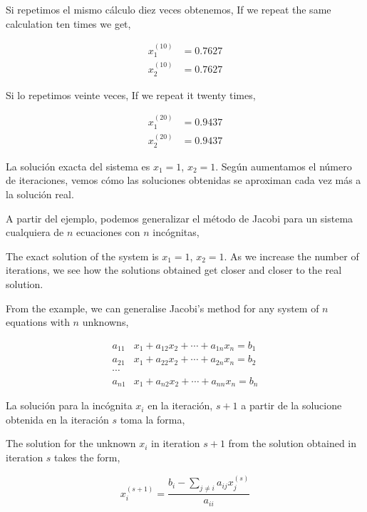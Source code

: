 \begin{paracol}{2}
Si repetimos el mismo cálculo diez veces obtenemos,
\switchcolumn
If we repeat the same calculation ten times we get,
\end{paracol}

\begin{align*}
x_1^{(10)}&=0.7627\\
x_2^{(10)}&=0.7627
\end{align*}

\begin{paracol}{2}
Si lo repetimos veinte veces,
\switchcolumn
If we repeat it twenty times,
\end{paracol}

\begin{align*}
x_1^{(20)}&=0.9437\\
x_2^{(20)}&=0.9437
\end{align*}

\begin{paracol}{2}
La solución exacta del sistema es $x_1=1$, $x_2=1$. Según aumentamos el número de iteraciones, vemos cómo las soluciones obtenidas se aproximan cada vez más a la solución real.

A partir del ejemplo, podemos generalizar el método de Jacobi para un sistema cualquiera de $n$ ecuaciones con $n$ incógnitas,

\switchcolumn
The exact solution of the system is $x_1=1$, $x_2=1$. As we increase the number of iterations, we see how the solutions obtained get closer and closer to the real solution.

From the example, we can generalise Jacobi's method for any system of $n$ equations with $n$ unknowns,
\end{paracol}

\begin{align*}
a_{11}&x_1+a_{12}x_2+\cdots +a_{1n}x_n=b_1\\
a_{21}&x_1+a_{22}x_2+\cdots +a_{2n}x_n=b_2\\
\cdots & \\
a_{n1}&x_1+a_{n2}x_2+\cdots +a_{nn}x_n=b_n
\end{align*}

\begin{paracol}{2}

La solución para la incógnita $x_i$ en la iteración, $s+1$ a partir de la solucione obtenida en la iteración $s$ toma la forma,

\switchcolumn
The solution for the unknown $x_i$ in iteration $s+1$ from the solution obtained in iteration $s$ takes the form,

\end{paracol}
\begin{equation*}
x_i^{(s+1)}=\frac{b_i-\sum_{j\neq i}a_{ij}x_j^{(s)}}{a_{ii}}
\end{equation*}

